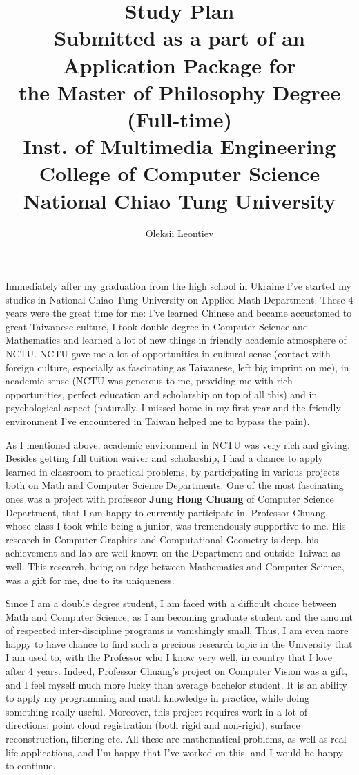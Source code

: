 \documentclass[8pt]{article} %
\title{Study Plan\\Submitted as a part of an\\Application Package for\\the Master of Philosophy Degree (Full-time)\\Inst. of Multimedia Engineering
 \\College of Computer Science\\National Chiao Tung University}
\author{Oleksii Leontiev}
\begin{document}
\begin{CJK}{UTF8}{bsmi}
\maketitle
\end{CJK}
Immediately after my graduation from the high school in Ukraine I've started my studies in National Chiao Tung University on Applied Math Department. These 4 years were the 
great time for me: I've learned Chinese and became accustomed to great Taiwanese culture, I took double degree in Computer Science and Mathematics and learned a lot of new
things in friendly academic atmosphere of NCTU. NCTU gave me a lot of opportunities in cultural sense (contact with foreign culture, especially as fascinating as Taiwanese,
left big imprint on me), in academic sense (NCTU was generous to me, providing me with rich opportunities, perfect education and scholarship on top of all this) and in
psychological aspect (naturally, I missed home in my first year and the friendly environment I've encountered in Taiwan helped me to bypass the pain).

As I mentioned above, academic environment in NCTU was very rich and giving. Besides getting full tuition waiver and scholarship, I had a chance to apply learned in classroom to
practical problems, by participating in various projects both on Math and Computer Science Departments. One of the most fascinating ones was a project with professor
\textbf{Jung Hong Chuang} of Computer Science Department, that I am happy to currently participate in. Professor Chuang, whose class I took while being
a junior, was tremendously supportive to me. His research in Computer Graphics and Computational Geometry is deep, his achievement and lab are well-known on the Department
and outside Taiwan as well. This research, being on edge between Mathematics and Computer Science, was a gift for me, due to its uniqueness.

Since I am a double degree student, I am faced with a difficult choice between Math and Computer Science, as I am becoming graduate student and the amount of respected
inter-discipline programs is vanishingly small. Thus, I am even more happy to have chance to find such a precious research topic in the University that I am used to, with the 
Professor who I know very well, in country that I love after 4 years. Indeed, Professor Chuang's project on Computer Vision was a gift, and I feel myself much more
lucky than average bachelor student. It is an ability to apply my programming and math knowledge in practice, while doing something really useful. Moreover, this project
requires work in a lot of directions: point cloud registration (both rigid and non-rigid), surface reconstruction, filtering etc. All these are mathematical problems,
as well as real-life applications, and I'm happy that I've worked on this, and I would be happy to continue.
\end{document}

